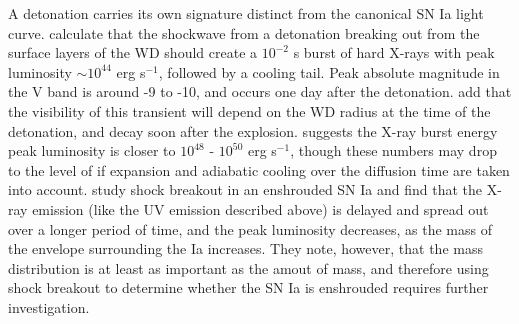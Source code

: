 A detonation carries its own signature distinct from the canonical SN Ia light curve.  \cite{pirocw10} calculate that the shockwave from a detonation breaking out from the surface layers of the WD should create a $10^{-2}$ s burst of hard X-rays with peak luminosity $\sim 10^{44}$ erg s$^{-1}$, followed by a cooling tail.  Peak absolute magnitude in the V band is around -9 to -10, and occurs one day after the detonation.  \citeauthor{pirocw10} add that the visibility of this transient will depend on the WD radius at the time of the detonation, and {\Ni} decay soon after the explosion.  \cite{hofls09} suggests the X-ray burst energy peak luminosity is closer to $10^{48}$ - $10^{50}$ erg s$^{-1}$, though these numbers may drop to the level of \citeauthor{pirocw10} if expansion and adiabatic cooling over the diffusion time are taken into account.  \citeauthor{frye+10} study shock breakout in an enshrouded SN Ia and find that the X-ray emission (like the UV emission described above) is delayed and spread out over a longer period of time, and the peak luminosity decreases, as the mass of the envelope surrounding the Ia increases.  They note, however, that the mass distribution is at least as important as the amout of mass, and therefore using shock breakout to determine whether the SN Ia is enshrouded requires further investigation.


